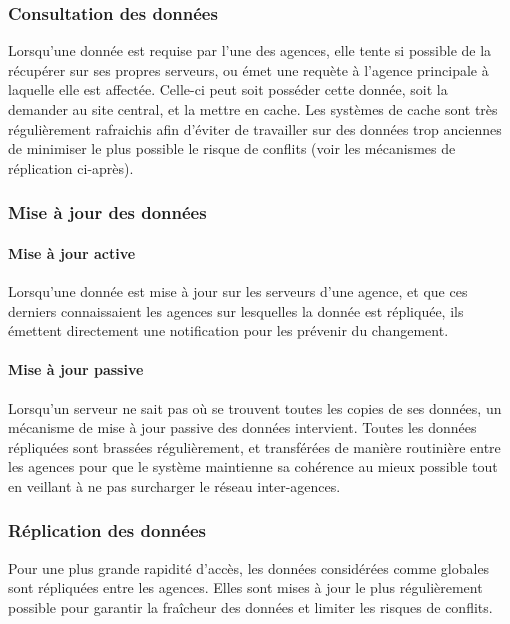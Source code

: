 \subsubsection{Consultation des données}

Lorsqu'une donnée est requise par l'une des agences, elle tente si possible de la récupérer sur ses
propres serveurs, ou émet une requète à l'agence principale à laquelle elle est affectée. Celle-ci
peut soit posséder cette donnée, soit la demander au site central, et la mettre en cache. Les systèmes
de cache sont très régulièrement rafraichis afin d'éviter de travailler sur des données trop anciennes
de minimiser le plus possible le risque de conflits (voir les mécanismes de réplication ci-après).

\subsubsection{Mise à jour des données}

\paragraph{Mise à jour active}

Lorsqu'une donnée est mise à jour sur les serveurs d'une agence, et que ces derniers connaissaient les
agences sur lesquelles la donnée est répliquée, ils émettent directement une notification pour les
prévenir du changement.

\paragraph{Mise à jour passive}

Lorsqu'un serveur ne sait pas où se trouvent toutes les copies de ses données, un mécanisme de mise à
jour passive des données intervient. Toutes les données répliquées sont brassées régulièrement,
et transférées de manière routinière entre les agences pour que le système maintienne sa cohérence au
mieux possible tout en veillant à ne pas surcharger le réseau inter-agences.

\subsubsection{Réplication des données}

Pour une plus grande rapidité d'accès, les données considérées comme globales sont répliquées entre les
agences. Elles sont mises à jour le plus régulièrement possible pour garantir la fraîcheur des données
et limiter les risques de conflits.

